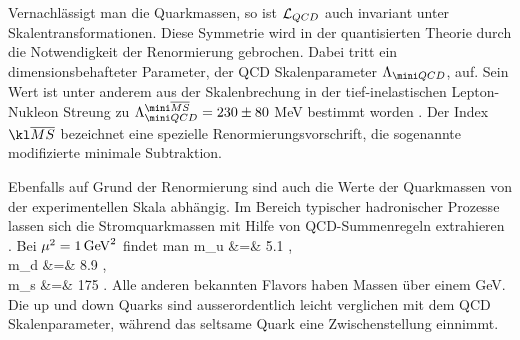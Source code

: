 Vernachl\"assigt man die Quarkmassen, so ist ${\cal L}_{QCD}$ auch
invariant unter Skalentransformationen. Diese Symmetrie wird in der
quantisierten Theorie durch die Notwendigkeit der Renormierung
gebrochen. Dabei tritt ein dimensionsbehafteter Parameter, der
QCD Skalenparameter $\Lambda_{\mini QCD}$, auf. Sein Wert ist unter anderem 
aus der Skalenbrechung in der tief-inelastischen Lepton-Nukleon Streung zu
$\Lambda_{\mini QCD}^{\mini\overline{MS}} =230\pm 80$ MeV bestimmt worden
\cite{PDG90}. Der Index ${\kl \overline{MS}}$ bezeichnet eine spezielle
Renormierungsvorschrift, die sogenannte modifizierte minimale 
Subtraktion.

Ebenfalls auf Grund der Renormierung sind  auch die Werte der 
Quarkmassen von der experimentellen Skala abh\"angig.
Im Bereich typischer hadronischer Prozesse lassen sich 
die Stromquarkmassen mit Hilfe von QCD-Summenregeln 
extrahieren \cite{GL82}. Bei $\mu^2=1\,{\rm GeV}^2$ findet man
\cite{Leu89}
\beq
   m_u &=& 5.1  , \nonumber  \\
   m_d &=& 8.9  , \\
   m_s &=& 175  .  \nonumber
\eeq   
Alle anderen bekannten Flavors haben Massen \"uber einem GeV. Die
up und down Quarks sind ausserordentlich leicht verglichen mit dem
QCD Skalenparameter, w\"ahrend das seltsame Quark eine Zwischenstellung
einnimmt.   

